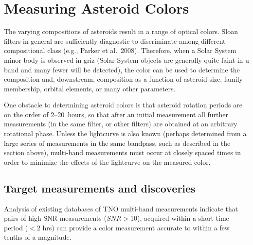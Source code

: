 %
%

\section{Measuring Asteroid Colors}
\def\secname{\chpname:colors}\label{sec:\secname}

The varying compositions of asteroids result in a range of optical
colors. Sloan filters in general are sufficiently diagnostic to
discriminate among different compositional class (e.g., Parker et al.\
2008).
Therefore, when a Solar System minor body is observed in griz (Solar
System objects are generally quite faint in u band and many fewer will
be detected),
the color can be used to determine the
composition and, downstream, composition as a function of asteroid size,
family membership, orbital elements, or many other parameters.


One obstacle to determining asteroid colors is that asteroid rotation
periods are on the order of 2--20~hours, so that after an initial
measurement all further measurements (in the same filter, or other
filters) are obtained at an arbitrary rotational phase. Unless the
lightcurve is also known (perhaps determined from a large series of
measurements in the same bandpass, such as described in the section
above), multi-band measurements must occur at closely spaced times in
order to minimize the effects of the lightcurve on the measured color.


\subsection{Target measurements and discoveries}
\label{sec:\secname:targets}

Analysis of existing databases of TNO multi-band measurements indicate
that pairs of high SNR measurements ($SNR>10$), acquired within a short
time period ($<2$ hrs) can provide a color measurement accurate to
within a few tenths
of a magnitude. 


